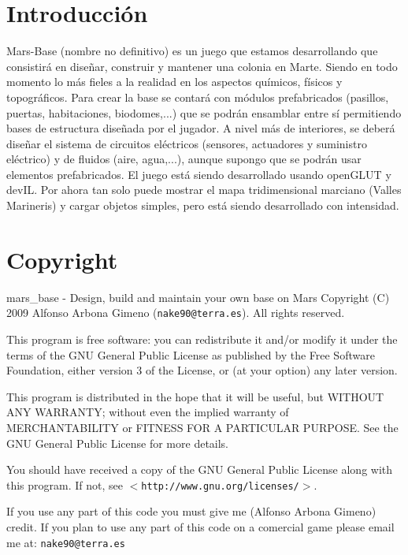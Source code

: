\section{Introducción}\label{index_intro_sec}
Mars-\/Base (nombre no definitivo) es un juego que estamos desarrollando que consistirá en diseñar, construir y mantener una colonia en Marte. Siendo en todo momento lo más fieles a la realidad en los aspectos químicos, físicos y topográficos. Para crear la base se contará con módulos prefabricados (pasillos, puertas, habitaciones, biodomes,...) que se podrán ensamblar entre sí permitiendo bases de estructura diseñada por el jugador. A nivel más de interiores, se deberá diseñar el sistema de circuitos eléctricos (sensores, actuadores y suministro eléctrico) y de fluidos (aire, agua,...), aunque supongo que se podrán usar elementos prefabricados. El juego está siendo desarrollado usando openGLUT y devIL. Por ahora tan solo puede mostrar el mapa tridimensional marciano (Valles Marineris) y cargar objetos simples, pero está siendo desarrollado con intensidad.\section{Copyright}\label{index_copyright}
mars\_\-base -\/ Design, build and maintain your own base on Mars Copyright (C) 2009 Alfonso Arbona Gimeno ({\tt nake90@terra.es}). All rights reserved.

This program is free software: you can redistribute it and/or modify it under the terms of the GNU General Public License as published by the Free Software Foundation, either version 3 of the License, or (at your option) any later version.

This program is distributed in the hope that it will be useful, but WITHOUT ANY WARRANTY; without even the implied warranty of MERCHANTABILITY or FITNESS FOR A PARTICULAR PURPOSE. See the GNU General Public License for more details.

You should have received a copy of the GNU General Public License along with this program. If not, see $<${\tt http://www.gnu.org/licenses/}$>$.

If you use any part of this code you must give me (Alfonso Arbona Gimeno) credit. If you plan to use any part of this code on a comercial game please email me at: {\tt nake90@terra.es} 